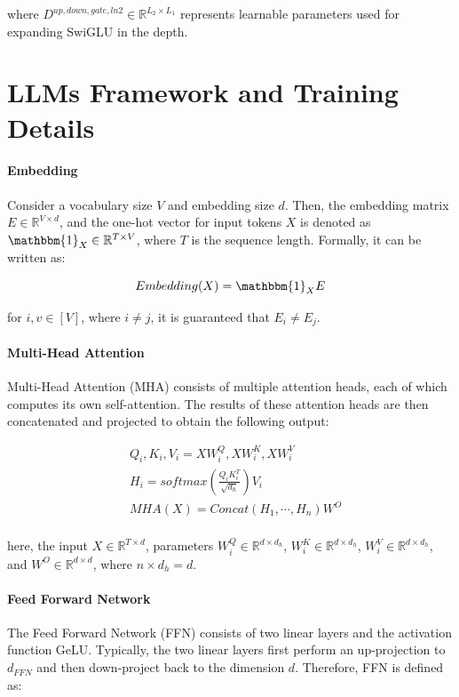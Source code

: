 \documentclass{article}
\begin{document}
where $D^{up,down,gate,ln2} \in \mathbb{R}^{L_2 \times L_1}$ represents learnable parameters used for expanding SwiGLU in the depth.

\section{LLMs Framework and Training Details}\label{app:llm_framework}

\paragraph{Embedding} Consider a vocabulary size $V$ and embedding size $d$. Then, the embedding matrix $E \in \mathbb{R}^{V \times d}$, and the one-hot vector for input tokens $X$ is denoted as $\mathbbm{1}_X \in \mathbb{R}^{T \times V}$, where $T$ is the sequence length. Formally, it can be written as:

\begin{equation}
    Embedding(X) = \mathbbm{1}_XE
\end{equation}

for $i,v \in [V]$, where $i \neq j$, it is guaranteed that $E_i \neq E_j$.

\paragraph{Multi-Head Attention}

Multi-Head Attention (MHA) consists of multiple attention heads, each of which computes its own self-attention. The results of these attention heads are then concatenated and projected to obtain the following output:

\begin{equation}
\begin{matrix}
    & Q_i, K_i, V_i = XW^Q_i, XW^K_i, XW^V_i \\
    & H_i = softmax(\frac{Q_iK_i^T}{\sqrt{d_h}})V_i \\
    & MHA(X) = Concat(H_1,\cdots,H_n)W^O \\
\end{matrix}
\end{equation}

here, the input $X \in \mathbb{R}^{T \times d}$, parameters $W_i^Q \in \mathbb{R}^{d \times d_h}$, $W_i^K \in \mathbb{R}^{d \times d_h}$, $W_i^V \in \mathbb{R}^{d \times d_h}$, and $W^O \in \mathbb{R}^{d \times d}$, where $n \times d_h = d$.

\paragraph{Feed Forward Network}
The Feed Forward Network (FFN) consists of two linear layers and the activation function GeLU. Typically, the two linear layers first perform an up-projection to $d_{FFN}$ and then down-project back to the dimension $d$. Therefore, FFN is defined as:
\end{document}
